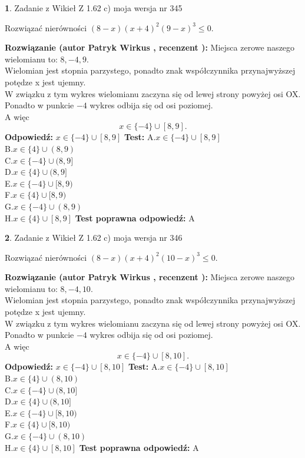 \documentclass[12pt, a4paper]{article}
\theoremstyle{definition} %
\newtheorem{zad}{}
\newcommand{\zadStart}[1]{\begin{zad}#1\newline}
\newcommand{\zadStop}{\end{zad}}
\newcommand{\rozwStart}[2]{\noindent \textbf{Rozwiązanie (autor #1 , recenzent #2): }\newline}
\newcommand{\rozwStop}{\newline}
\newcommand{\odpStart}{\noindent \textbf{Odpowiedź:}\newline}
\newcommand{\odpStop}{\newline}
\newcommand{\testStart}{\noindent \textbf{Test:}\newline}
\newcommand{\testStop}{\newline}
\newcommand{\kluczStart}{\noindent \textbf{Test poprawna odpowiedź:}\newline}
\newcommand{\kluczStop}{\newline}
\begin{document}
\zadStart{Zadanie z Wikieł Z 1.62 c) moja wersja nr 345}

Rozwiązać nierówności $(8-x)(x+4)^{2}(9-x)^{3}\le0$.
\zadStop
\rozwStart{Patryk Wirkus}{}
Miejsca zerowe naszego wielomianu to: $8, -4, 9$.\\
Wielomian jest stopnia parzystego, ponadto znak współczynnika przy\linebreak najwyższej potędze x jest ujemny.\\ W związku z tym wykres wielomianu zaczyna się od lewej strony powyżej osi OX.\\
Ponadto w punkcie $-4$ wykres odbija się od osi poziomej.\\
A więc $$x \in \{-4\} \cup [8,9].$$
\rozwStop
\odpStart
$x \in \{-4\} \cup [8,9]$
\odpStop
\testStart
A.$x \in \{-4\} \cup [8,9]$\\
B.$x \in \{4\} \cup (8,9)$\\
C.$x \in \{-4\} \cup (8,9]$\\
D.$x \in \{4\} \cup (8,9]$\\
E.$x \in \{-4\} \cup [8,9)$\\
F.$x \in \{4\} \cup [8,9)$\\
G.$x \in \{-4\} \cup (8,9)$\\
H.$x \in \{4\} \cup [8,9]$
\testStop
\kluczStart
A
\kluczStop



\zadStart{Zadanie z Wikieł Z 1.62 c) moja wersja nr 346}

Rozwiązać nierówności $(8-x)(x+4)^{2}(10-x)^{3}\le0$.
\zadStop
\rozwStart{Patryk Wirkus}{}
Miejsca zerowe naszego wielomianu to: $8, -4, 10$.\\
Wielomian jest stopnia parzystego, ponadto znak współczynnika przy\linebreak najwyższej potędze x jest ujemny.\\ W związku z tym wykres wielomianu zaczyna się od lewej strony powyżej osi OX.\\
Ponadto w punkcie $-4$ wykres odbija się od osi poziomej.\\
A więc $$x \in \{-4\} \cup [8,10].$$
\rozwStop
\odpStart
$x \in \{-4\} \cup [8,10]$
\odpStop
\testStart
A.$x \in \{-4\} \cup [8,10]$\\
B.$x \in \{4\} \cup (8,10)$\\
C.$x \in \{-4\} \cup (8,10]$\\
D.$x \in \{4\} \cup (8,10]$\\
E.$x \in \{-4\} \cup [8,10)$\\
F.$x \in \{4\} \cup [8,10)$\\
G.$x \in \{-4\} \cup (8,10)$\\
H.$x \in \{4\} \cup [8,10]$
\testStop
\kluczStart
A
\kluczStop
\end{document}
